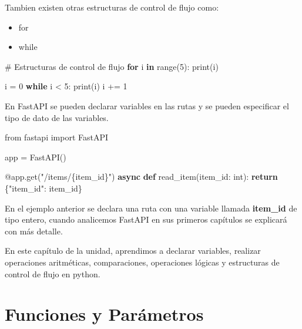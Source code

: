 \documentclass[
  a4paper,
  DIV=11,
  numbers=noendperiod,
  onepage,
  openany]{scrreprt}
\newenvironment{Shaded}{\begin{snugshade}}{\end{snugshade}}
\newcommand{\AttributeTok}[1]{\textcolor[rgb]{0.40,0.45,0.13}{#1}}
\newcommand{\BuiltInTok}[1]{\textcolor[rgb]{0.00,0.23,0.31}{#1}}
\newcommand{\CommentTok}[1]{\textcolor[rgb]{0.37,0.37,0.37}{#1}}
\newcommand{\ControlFlowTok}[1]{\textcolor[rgb]{0.00,0.23,0.31}{\textbf{#1}}}
\newcommand{\DecValTok}[1]{\textcolor[rgb]{0.68,0.00,0.00}{#1}}
\newcommand{\ImportTok}[1]{\textcolor[rgb]{0.00,0.46,0.62}{#1}}
\newcommand{\KeywordTok}[1]{\textcolor[rgb]{0.00,0.23,0.31}{\textbf{#1}}}
\newcommand{\NormalTok}[1]{\textcolor[rgb]{0.00,0.23,0.31}{#1}}
\newcommand{\OperatorTok}[1]{\textcolor[rgb]{0.37,0.37,0.37}{#1}}
\newcommand{\SpecialCharTok}[1]{\textcolor[rgb]{0.37,0.37,0.37}{#1}}
\newcommand{\StringTok}[1]{\textcolor[rgb]{0.13,0.47,0.30}{#1}}
\providecommand{\tightlist}{%
  \setlength{\itemsep}{0pt}\setlength{\parskip}{0pt}}\usepackage{longtable,booktabs,array}
\begin{document}
Tambien existen otras estructuras de control de flujo como:

\begin{itemize}
\tightlist
\item
  for
\item
  while
\end{itemize}

\begin{Shaded}
\begin{Highlighting}[]
\CommentTok{\# Estructuras de control de flujo}
\ControlFlowTok{for}\NormalTok{ i }\KeywordTok{in} \BuiltInTok{range}\NormalTok{(}\DecValTok{5}\NormalTok{):}
    \BuiltInTok{print}\NormalTok{(i)}
    
\NormalTok{i }\OperatorTok{=} \DecValTok{0}
\ControlFlowTok{while}\NormalTok{ i }\OperatorTok{\textless{}} \DecValTok{5}\NormalTok{:}
    \BuiltInTok{print}\NormalTok{(i)}
\NormalTok{    i }\OperatorTok{+=} \DecValTok{1}
\end{Highlighting}
\end{Shaded}

En FastAPI se pueden declarar variables en las rutas y se pueden
especificar el tipo de dato de las variables.

\begin{Shaded}
\begin{Highlighting}[]
\ImportTok{from}\NormalTok{ fastapi }\ImportTok{import}\NormalTok{ FastAPI}

\NormalTok{app }\OperatorTok{=}\NormalTok{ FastAPI()}

\AttributeTok{@app.get}\NormalTok{(}\StringTok{"/items/}\SpecialCharTok{\{item\_id\}}\StringTok{"}\NormalTok{)}
\ControlFlowTok{async} \KeywordTok{def}\NormalTok{ read\_item(item\_id: }\BuiltInTok{int}\NormalTok{):}
    \ControlFlowTok{return}\NormalTok{ \{}\StringTok{"item\_id"}\NormalTok{: item\_id\}}
\end{Highlighting}
\end{Shaded}

En el ejemplo anterior se declara una ruta con una variable llamada
\textbf{item\_id} de tipo entero, cuando analicemos FastAPI en sus
primeros capítulos se explicará con más detalle.

En este capítulo de la unidad, aprendimos a declarar variables, realizar
operaciones aritméticas, comparaciones, operaciones lógicas y
estructuras de control de flujo en python.

\chapter{Funciones y Parámetros}\label{funciones-y-paruxe1metros}
\end{document}
